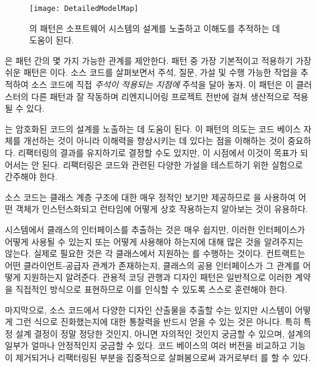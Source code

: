 \documentclass[a4paper,10pt,twoside]{book}
\begin{document}
\begin{figure}
\begin{center}
\texttt{[image: DetailedModelMap]}
\caption{의 패턴은 소프트웨어 시스템의 설계를 노출하고 이해도를 추적하는 데 도움이 된다.}
\end{center}
\end{figure}

은 패턴 간의 몇 가지 가능한 관계를 제안한다. 패턴 중 가장 기본적이고 적용하기 가장 쉬운 패턴은 이다. 소스 코드를 살펴보면서 주석, 질문, 가설 및 수행 가능한 작업을 추적하여 소스 코드에 직접 \emph{주석이 적용되는 지점에} 주석을 달아 놓자. 이 패턴은 이 클러스터의 다른 패턴과 잘 작동하며 리엔지니어링 프로젝트 전반에 걸쳐 생산적으로 적용될 수 있다.

는 암호화된 코드의 설계를 노출하는 데 도움이 된다. 이 패턴의 의도는 코드 베이스 자체를 개선하는 것이 아니라 이해력을 향상시키는 데 있다는 점을 이해하는 것이 중요하다. 리팩터링의 결과를 유지하기로 결정할 수도 있지만, 이 시점에서 이것이 목표가 되어서는 안 된다. 리팩터링은 코드와 관련된 다양한 가설을 테스트하기 위한 실험으로 간주해야 한다. 

소스 코드는 클래스 계층 구조에 대한 매우 정적인 보기만 제공하므로 을 사용하여 어떤 객체가 인스턴스화되고 런타임에 어떻게 상호 작용하는지 알아보는 것이 유용하다.

시스템에서 클래스의 인터페이스를 추출하는 것은 매우 쉽지만, 이러한 인터페이스가 어떻게 사용될 수 있는지 또는 어떻게 사용해야 하는지에 대해 많은 것을 알려주지는 않는다. 실제로 필요한 것은 각 클래스에서 지원하는 를 수행하는 것이다. 컨트랙트는 어떤 클라이언트-공급자 관계가 존재하는지, 클래스의 공용 인터페이스가 그 관계를 어떻게 지원하는지 알려준다. 관용적 코딩 관행과 디자인 패턴은 일반적으로 이러한 계약을 직접적인 방식으로 표현하므로 이를 인식할 수 있도록 스스로 훈련해야 한다.

마지막으로, 소스 코드에서 다양한 디자인 산출물을 추출할 수는 있지만 시스템이 어떻게 그런 식으로 진화했는지에 대한 통찰력을 반드시 얻을 수 있는 것은 아니다. 특히 특정 설계 결정이 정말 정당한 것인지, 아니면 자의적인 것인지 궁금할 수 있으며, 설계의 일부가 얼마나 안정적인지 궁금할 수 있다. 코드 베이스의 여러 버전을 비교하고 기능이 제거되거나 리팩터링된 부분을 집중적으로 살펴봄으로써 과거로부터 를 할 수 있다.
\end{document}
